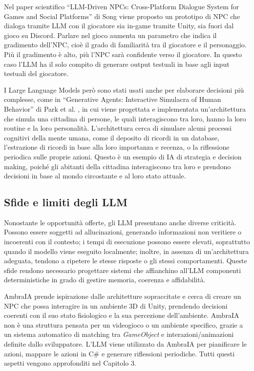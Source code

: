 Nel paper scientifico ``LLM-Driven NPCs: Cross-Platform Dialogue System for Games and Social Platforms'' di Song \cite{song2025llmnpc} viene proposto un prototipo di NPC che dialoga tramite LLM con il giocatore sia in-game tramite Unity, sia fuori dal gioco su Discord. Parlare nel gioco aumenta un parametro che indica il gradimento dell'NPC, cioè il grado di familiarità tra il giocatore e il personaggio. Più il gradimento è alto, più l'NPC sarà confidente verso il giocatore. In questo caso l'LLM ha il solo compito di generare output testuali in base agli input testuali del giocatore.

I Large Language Models però sono stati usati anche per elaborare decisioni più complesse, come in ``Generative Agents: Interactive Simulacra of Human Behavior'' di Park et al. \cite{park2023generative}, in cui viene progettata e implementata un'architettura che simula una cittadina di persone, le quali interagiscono tra loro, hanno la loro routine e la loro personalità. L'architettura cerca di simulare alcuni processi cognitivi della mente umana, come il deposito di ricordi in un database, l'estrazione di ricordi in base alla loro importanza e recenza, o la riflessione periodica sulle proprie azioni. Questo è un esempio di IA di strategia e decision making, poiché gli abitanti della cittadina interagiscono tra loro e prendono decisioni in base al mondo circostante e al loro stato attuale.

\subsection{Sfide e limiti degli LLM}

Nonostante le opportunità offerte, gli LLM presentano anche diverse criticità. Possono essere soggetti ad allucinazioni, generando informazioni non veritiere o incoerenti con il contesto; i tempi di esecuzione possono essere elevati, soprattutto quando il modello viene eseguito localmente; inoltre, in assenza di un'architettura adeguata, tendono a ripetere le stesse risposte o gli stessi comportamenti. Queste sfide rendono necessario progettare sistemi che affianchino all'LLM componenti deterministiche in grado di gestire memoria, coerenza e affidabilità.

AmbraIA prende ispirazione dalle architetture sopraccitate e cerca di creare un NPC che possa interagire in un ambiente 3D di Unity, prendendo decisioni coerenti con il suo stato fisiologico e la sua percezione dell'ambiente. AmbraIA non è una struttura pensata per un videogioco o un ambiente specifico, grazie a un sistema automatico di matching tra \textit{GameObject} e interazioni/animazioni definite dallo sviluppatore. L'LLM viene utilizzato da AmbraIA per pianificare le azioni, mappare le azioni in C\# e generare riflessioni periodiche. Tutti questi aspetti vengono approfonditi nel Capitolo 3.

